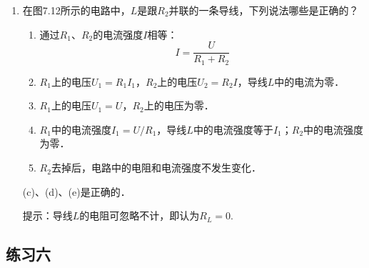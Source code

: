 \begin{enumerate}
    \item 在图7.12所示的电路中，$L$是跟$R_2$并联的一条导线，下列说法哪些是正确的？

    
    \begin{enumerate}
        \item 通过$R_1$、$R_2$的电流强度$I$相等：
        \[I=\frac{U}{R_1+R_2} \]
        \item $R_1$上的电压$U_1=R_1I_1$，$R_2$上的电压$U_2=R_2I$，导线$L$中的电流为零．
        \item $R_1$上的电压$U_1=U$，$R_2$上的电压为零．
        \item $R_1$中的电流强度$I_1=U/R_1$，导线$L$中的电流强度等于$I_1$；$R_2$中的电流强度为零．
\item $R_2$去掉后，电路中的电阻和电流强度不发生变化．
    \end{enumerate}

    \begin{solution}
(c)、(d)、(e)是正确的．

提示：导线$L$的电阻可忽略不计，即认为$R_L=0$.
    \end{solution}
\end{enumerate}



\subsection{练习六}

